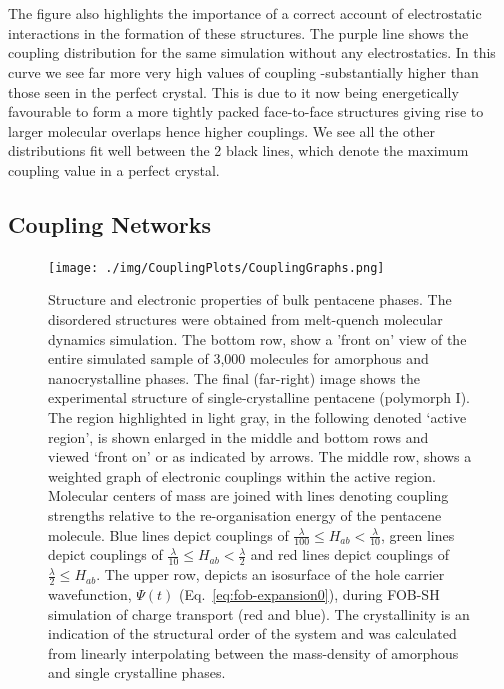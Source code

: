 \\\\
The figure also highlights the importance of a correct account of electrostatic interactions in the formation of these structures. The purple line shows the coupling distribution for the same simulation without any electrostatics. In this curve we see far more very high values of coupling -substantially higher than those seen in the perfect crystal. This is due to it now being energetically favourable to form a more tightly packed face-to-face structures giving rise to larger molecular overlaps hence higher couplings. We see all the other distributions fit well between the 2 black lines, which denote the maximum coupling value in a perfect crystal.
\subsection{Coupling Networks}
\label{sect:couplGraphs}
\begin{figure}[ht]
	\texttt{[image: ./img/CouplingPlots/CouplingGraphs.png]}
	\caption{\label{fig:crystalCouplingGraph}Structure and electronic properties of bulk pentacene phases.  The disordered structures were obtained from melt-quench molecular dynamics simulation.   
	The bottom row, show a 'front on' view of the entire simulated sample of 3,000 molecules for amorphous and nanocrystalline phases.  The final (far-right) image shows the experimental structure of single-crystalline pentacene (polymorph I)\cite{Campbell1961}.  
    The region highlighted in light gray, in the following denoted `active region', is shown enlarged in the middle and bottom rows and viewed `front on' or as indicated by arrows. 
     The middle row, shows a weighted graph of electronic couplings within the active region. Molecular centers of mass are joined with lines denoting coupling 
    strengths relative to the re-organisation energy of the pentacene molecule. Blue lines depict couplings of $\frac{\lambda}{100} \le H_{ab} < \frac{\lambda}{10}$, 
    green lines depict couplings of $\frac{\lambda}{10} \le H_{ab} < \frac{\lambda}{2}$ and red lines depict couplings of $\frac{\lambda}{2} \le H_{ab}$.
     The upper row, depicts an isosurface of the hole carrier wavefunction, $\Psi(t)$ (Eq.~\ref{eq:fob-expansion0}), during 
     FOB-SH simulation of charge transport (red and blue).
     The crystallinity is an indication of the structural order of the system and was calculated from linearly interpolating between the mass-density of amorphous and single crystalline 
	 phases.}
\end{figure}
